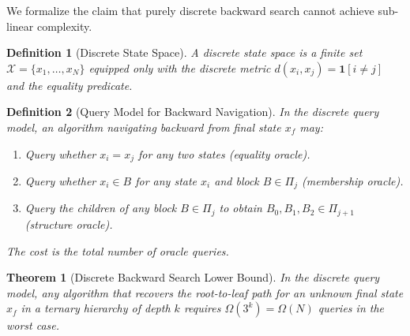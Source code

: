 \documentclass[12pt,twocolumn]{article}
\newtheorem{theorem}{Theorem}[section]
\newtheorem{definition}{Definition}[section]
\begin{document}
We formalize the claim that purely discrete backward search cannot achieve sub-linear complexity.

\begin{definition}[Discrete State Space]
\label{def:discrete_space}
A \emph{discrete state space} is a finite set $\mathcal{X} = \{x_1, \ldots, x_N\}$ equipped only with the discrete metric $d(x_i, x_j) = \mathbf{1}[i \neq j]$ and the equality predicate.
\end{definition}

\begin{definition}[Query Model for Backward Navigation]
\label{def:query_model}
In the \emph{discrete query model}, an algorithm navigating backward from final state $x_f$ may:
\begin{enumerate}
\item Query whether $x_i = x_j$ for any two states (equality oracle).
\item Query whether $x_i \in B$ for any state $x_i$ and block $B \in \Pi_j$ (membership oracle).
\item Query the children of any block $B \in \Pi_j$ to obtain $B_0, B_1, B_2 \in \Pi_{j+1}$ (structure oracle).
\end{enumerate}
The \emph{cost} is the total number of oracle queries.
\end{definition}

\begin{theorem}[Discrete Backward Search Lower Bound]
\label{thm:discrete_lower}
In the discrete query model, any algorithm that recovers the root-to-leaf path for an unknown final state $x_f$ in a ternary hierarchy of depth $k$ requires $\Omega(3^k) = \Omega(N)$ queries in the worst case.
\end{theorem}
\end{document}
